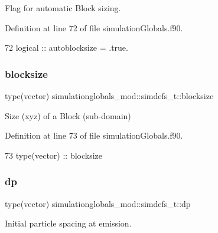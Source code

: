 Flag for automatic Block sizing. 



Definition at line 72 of file simulation\+Globals.\+f90.


\begin{DoxyCode}
72         \textcolor{keywordtype}{logical}         ::  autoblocksize = .true.   
\end{DoxyCode}
\mbox{\label{structsimulationglobals__mod_1_1simdefs__t_a163dc34a434aec7372dcad90b48ab0ed}} 
\subsubsection{\texorpdfstring{blocksize}{blocksize}}
{\footnotesize\ttfamily type(vector) simulationglobals\+\_\+mod\+::simdefs\+\_\+t\+::blocksize\hspace{0.3cm}{\ttfamily [private]}}



Size (xyz) of a Block (sub-\/domain) 



Definition at line 73 of file simulation\+Globals.\+f90.


\begin{DoxyCode}
73         \textcolor{keywordtype}{type}(vector)    ::  blocksize
\end{DoxyCode}
\mbox{\label{structsimulationglobals__mod_1_1simdefs__t_af09254532178c7d37b6502af7ead113c}} 
\subsubsection{\texorpdfstring{dp}{dp}}
{\footnotesize\ttfamily type(vector) simulationglobals\+\_\+mod\+::simdefs\+\_\+t\+::dp\hspace{0.3cm}{\ttfamily [private]}}



Initial particle spacing at emission. 



